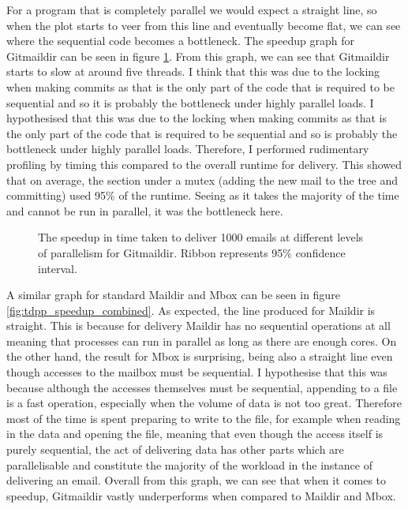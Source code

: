 For a program that is completely parallel we would expect a straight line, so when the plot starts to veer from this line and eventually become flat, we can see where the sequential code becomes a bottleneck. The speedup graph for Gitmaildir can be seen in figure \ref{fig:tdpp_speedup}. From this graph, we can see that Gitmaildir starts to slow at around five threads. I think that this was due to the locking when making commits as that is the only part of the code that is required to be sequential and so it is probably the bottleneck under highly parallel loads.
I hypothesised that this was due to the locking when making commits as that is the only part of the code that is required to be sequential and so is probably the bottleneck under highly parallel loads. Therefore, I performed rudimentary profiling by timing this compared to the overall runtime for delivery. This showed that on average, the section under a mutex (adding the new mail to the tree and committing) used 95\% of the runtime. Seeing as it takes the majority of the time and cannot be run in parallel, it was the bottleneck here.

\begin{figure}[h]
    \centering
    
    \caption{The speedup in time taken to deliver 1000 emails at different levels of parallelism for Gitmaildir. Ribbon represents 95\% confidence interval.}
    \label{fig:tdpp_speedup}
\end{figure}

A similar graph for standard Maildir and Mbox can be seen in figure \ref{fig:tdpp_speedup_combined}. As expected, the line produced for Maildir is straight. This is because for delivery Maildir has no sequential operations at all meaning that processes can run in parallel as long as there are enough cores. On the other hand, the result for Mbox is surprising, being also a straight line even though accesses to the mailbox must be sequential. I hypothesise that this was because although the accesses themselves must be sequential, appending to a file is a fast operation, especially when the volume of data is not too great. Therefore most of the time is spent preparing to write to the file, for example when reading in the data and opening the file, meaning that even though the access itself is purely sequential, the act of delivering data has other parts which are parallelisable and constitute the majority of the workload in the instance of delivering an email. Overall from this graph, we can see that when it comes to speedup, Gitmaildir vastly underperforms when compared to Maildir and Mbox.

